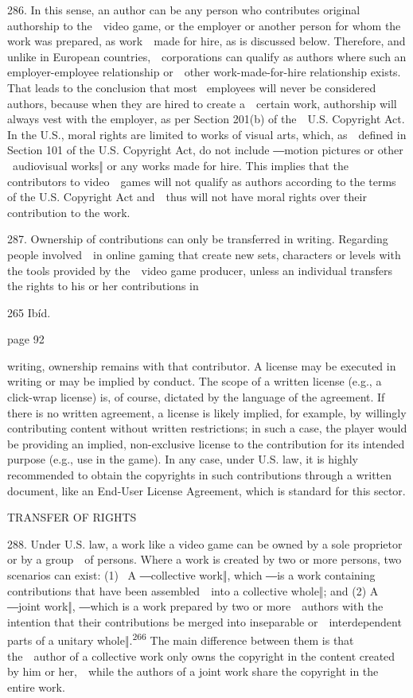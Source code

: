 \documentclass[
]{article}
\begin{document}
{286. }{In this sense, an author can be any person who contributes
original authorship to the~~video game, or the employer or another
person for whom the work was prepared, as work~~made for hire, as is
discussed below. Therefore, and unlike in European
countries,~~corporations can qualify as authors where such an
employer-employee relationship or~~other work-made-for-hire relationship
exists. That leads to the conclusion that most }{~employees }{will never
be considered }{authors}{, because when they are hired to create
a~~certain work, authorship will always vest with the employer, as per
Section 201(b) of the~~U.S. }{Copyright Act}{. In the U.S., moral rights
are limited to works of visual arts, which, as~~defined in Section 101
of the U.S. }{Copyright Act}{, do not inc}{lude ―}{motion pictures or
other }{~audiovisual works‖ }{or any works made for hire. This implies
that the contributors to video~~games will not qualify as authors
according to the terms of the U.S. }{Copyright Act }{and~~thus will not
have moral rights over their contribution to the work.}

{287. }{Ownership of contributions can only be transferred in writing.
Regarding people involved~~in online gaming that create new sets,
characters or levels with the tools provided by the~~video game
producer, unless an individual transfers the rights to his or her
contributions in}

{265 }{Ibíd.}

{page 92}

{writing, ownership remains with that contributor. A license may be
executed in writing or may be implied by conduct. The scope of a written
license (e.g., a click-wrap license) is, of course, dictated by the
language of the agreement. If there is no written agreement, a license
is likely implied, for example, by willingly contributing content
without written restrictions; in such a case, the player would be
providing an implied, non-exclusive license to the contribution for its
intended purpose (e.g., use in the game). In any case, under U.S. law,
it is highly recommended to obtain the copyrights in such contributions
through a written document, like an End-User License Agreement, which is
standard for this sector.}

{TRANSFER OF RIGHTS}

{288. }{Under U.S. law, a work like a video game can be owned by a sole
proprietor or by a group~~of persons. Where a work is created by two or
more persons, two scenarios can exist: (1) }{~A ―collective work‖, which
―}{is a work containing contributions that have been assembled~~into a
collective whole}{‖; and (2) A ―joint work‖, ―}{which is a work prepared
by two or more~~authors with the intention that their contributions be
merged into inseparable or~~interdependent parts of a unitary
whole}{‖.}\textsuperscript{{266 }}{The main difference between them is
that the~~author of a collective work only owns the copyright in the
content created by him or her,~~while the authors of a joint work share
the copyright in the entire work.}
\end{document}
